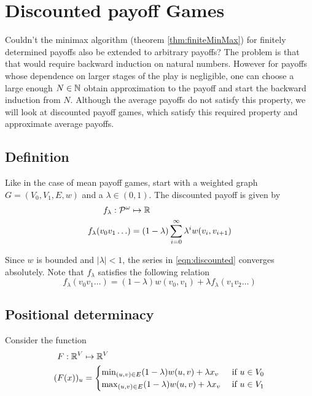 \chapter{Discounted payoff Games}

Couldn't the minimax algorithm (theorem \ref{thm:finiteMinMax}) for finitely determined payoffs also be extended to arbitrary payoffs? The problem is that that would require backward induction on natural numbers. However for payoffs whose dependence on larger stages of the play is negligible, one can choose a large enough $N \in \mathbb{N}$ obtain approximation to the payoff and start the backward induction from $N$. Although the average payoffs do not satisfy this property, we will look at discounted payoff games, which satisfy this required property and approximate average payoffs.

\section{Definition}
Like in the case of mean payoff games, start with a weighted graph $G=(V_0,V_1,E,w)$ and a $\lambda \in (0,1)$. The discounted payoff is given by
\begin{align}
    f_\lambda : \mathcal{P}^\omega &\mapsto \mathbb{R}\\
    f_\lambda(v_0 v_1 \ldots ) &= (1-\lambda) \sum_{i=0}^\infty \lambda^i w(v_i,v_{i+1}) \label{eqn:discounted}
\end{align}

Since $w$ is bounded and $|\lambda|<1$, the series in \eqref{eqn:discounted} converges absolutely. Note that $f_\lambda$ satisfies the following relation
\begin{equation}
    f_\lambda(v_0 v_1 \ldots ) = (1-\lambda) w(v_0, v_1) + \lambda f_\lambda(v_1 v_2 \ldots) \label{eqn:disc-recursive}
\end{equation}

\section{Positional determinacy}
Consider the function
\begin{align}
    F : \mathbb{R}^V &\mapsto \mathbb{R}^V \nonumber \\
    (F(x))_u &= \begin{cases}
        \min_{(u,v) \in E} (1-\lambda) w(u,v) + \lambda x_v & \text{ if } u \in V_0\\
        \max_{(u,v) \in E} (1-\lambda) w(u,v) + \lambda x_v & \text{ if } u \in V_1\\
    \end{cases} 
\end{align}

